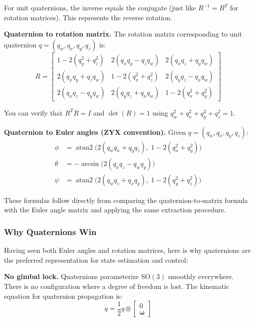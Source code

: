 For unit quaternions, the inverse equals the conjugate (just like $R^{-1} = R^T$ for rotation matrices). This represents the reverse rotation.

\textbf{Quaternion to rotation matrix.} The rotation matrix corresponding to unit quaternion $q = (q_w, q_x, q_y, q_z)$ is:
\begin{equation}
R = \begin{bmatrix}
1 - 2(q_y^2 + q_z^2) & 2(q_x q_y - q_z q_w) & 2(q_x q_z + q_y q_w) \\
2(q_x q_y + q_z q_w) & 1 - 2(q_x^2 + q_z^2) & 2(q_y q_z - q_x q_w) \\
2(q_x q_z - q_y q_w) & 2(q_y q_z + q_x q_w) & 1 - 2(q_x^2 + q_y^2)
\end{bmatrix}
\end{equation}

You can verify that $R^T R = I$ and $\det(R) = 1$ using $q_w^2 + q_x^2 + q_y^2 + q_z^2 = 1$.

\textbf{Quaternion to Euler angles (ZYX convention).} Given $q = (q_w, q_x, q_y, q_z)$:
\begin{align}
\phi &= \operatorname{atan2}\!\big(2(q_w q_x + q_y q_z), \; 1 - 2(q_x^2 + q_y^2)\big) \\
\theta &= -\arcsin\!\big(2(q_x q_z - q_w q_y)\big) \\
\psi &= \operatorname{atan2}\!\big(2(q_w q_z + q_x q_y), \; 1 - 2(q_y^2 + q_z^2)\big)
\end{align}

These formulas follow directly from comparing the quaternion-to-matrix formula with the Euler angle matrix and applying the same extraction procedure.

\subsubsection{Why Quaternions Win}

Having seen both Euler angles and rotation matrices, here is why quaternions are the preferred representation for state estimation and control:

\textbf{No gimbal lock.} Quaternions parameterize $\mathrm{SO}(3)$ smoothly everywhere. There is no configuration where a degree of freedom is lost. The kinematic equation for quaternion propagation is:
\begin{equation}
\dot{q} = \frac{1}{2} q \otimes \begin{bmatrix} 0 \\ \boldsymbol{\omega} \end{bmatrix}
\end{equation}

